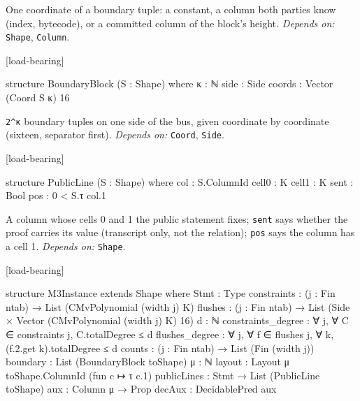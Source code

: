 
One coordinate of a boundary tuple: a constant, a column both parties know (index, bytecode), or a committed column of the block's height. \emph{Depends on:} \texttt{Shape}, \texttt{Column}.

\par\medskip\noindent\textbf{}\hfill\textsf{\small [load-bearing]}\par\nopagebreak

\begin{leancode}
structure BoundaryBlock (S : Shape) where
  κ : ℕ
  side : Side
  coords : Vector (Coord S κ) 16
\end{leancode}


\texttt{2\textasciicircum{}κ} boundary tuples on one side of the bus, given coordinate by coordinate (sixteen, separator first). \emph{Depends on:} \texttt{Coord}, \texttt{Side}.

\par\medskip\noindent\textbf{}\hfill\textsf{\small [load-bearing]}\par\nopagebreak

\begin{leancode}
structure PublicLine (S : Shape) where
  col : S.ColumnId
  cell0 : K
  cell1 : K
  sent : Bool
  pos : 0 < S.τ col.1
\end{leancode}


A column whose cells 0 and 1 the public statement fixes; \texttt{sent} says whether the proof carries its value (transcript only, not the relation); \texttt{pos} says the column has a cell 1. \emph{Depends on:} \texttt{Shape}.

\par\medskip\noindent\textbf{}\hfill\textsf{\small [load-bearing]}\par\nopagebreak

\begin{leancode}
structure M3Instance extends Shape where
  Stmt : Type
  constraints : (j : Fin ntab) → List (CMvPolynomial (width j) K)
  flushes : (j : Fin ntab) → List (Side × Vector (CMvPolynomial (width j) K) 16)
  d : ℕ
  constraints_degree : ∀ j, ∀ C ∈ constraints j, C.totalDegree ≤ d
  flushes_degree : ∀ j, ∀ f ∈ flushes j, ∀ k, (f.2.get k).totalDegree ≤ d
  counts : (j : Fin ntab) → List (Fin (width j))
  boundary : List (BoundaryBlock toShape)
  μ : ℕ
  layout : Layout μ toShape.ColumnId (fun c ↦ τ c.1)
  publicLines : Stmt → List (PublicLine toShape)
  aux : Column μ → Prop
  decAux : DecidablePred aux
\end{leancode}

